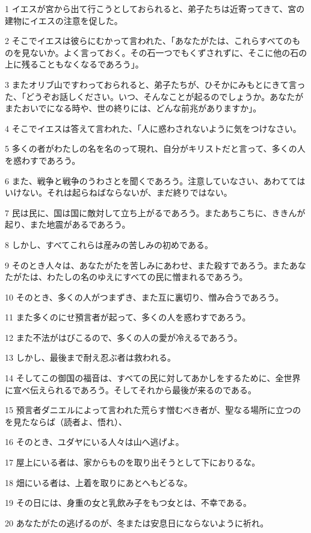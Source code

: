\par 1 イエスが宮から出て行こうとしておられると、弟子たちは近寄ってきて、宮の建物にイエスの注意を促した。
\par 2 そこでイエスは彼らにむかって言われた、「あなたがたは、これらすべてのものを見ないか。よく言っておく。その石一つでもくずされずに、そこに他の石の上に残ることもなくなるであろう」。
\par 3 またオリブ山ですわっておられると、弟子たちが、ひそかにみもとにきて言った、「どうぞお話しください。いつ、そんなことが起るのでしょうか。あなたがまたおいでになる時や、世の終りには、どんな前兆がありますか」。
\par 4 そこでイエスは答えて言われた、「人に惑わされないように気をつけなさい。
\par 5 多くの者がわたしの名を名のって現れ、自分がキリストだと言って、多くの人を惑わすであろう。
\par 6 また、戦争と戦争のうわさとを聞くであろう。注意していなさい、あわててはいけない。それは起らねばならないが、まだ終りではない。
\par 7 民は民に、国は国に敵対して立ち上がるであろう。またあちこちに、ききんが起り、また地震があるであろう。
\par 8 しかし、すべてこれらは産みの苦しみの初めである。
\par 9 そのとき人々は、あなたがたを苦しみにあわせ、また殺すであろう。またあなたがたは、わたしの名のゆえにすべての民に憎まれるであろう。
\par 10 そのとき、多くの人がつまずき、また互に裏切り、憎み合うであろう。
\par 11 また多くのにせ預言者が起って、多くの人を惑わすであろう。
\par 12 また不法がはびこるので、多くの人の愛が冷えるであろう。
\par 13 しかし、最後まで耐え忍ぶ者は救われる。
\par 14 そしてこの御国の福音は、すべての民に対してあかしをするために、全世界に宣べ伝えられるであろう。そしてそれから最後が来るのである。
\par 15 預言者ダニエルによって言われた荒らす憎むべき者が、聖なる場所に立つのを見たならば（読者よ、悟れ）、
\par 16 そのとき、ユダヤにいる人々は山へ逃げよ。
\par 17 屋上にいる者は、家からものを取り出そうとして下におりるな。
\par 18 畑にいる者は、上着を取りにあとへもどるな。
\par 19 その日には、身重の女と乳飲み子をもつ女とは、不幸である。
\par 20 あなたがたの逃げるのが、冬または安息日にならないように祈れ。
